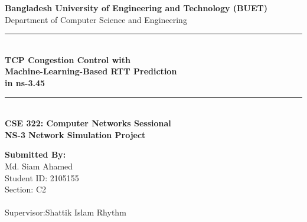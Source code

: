 \documentclass[12pt,a4paper]{article}
\begin{document}
\begin{titlepage}
\centering

\vspace*{1.5cm}

{\LARGE\bfseries Bangladesh University of Engineering and Technology (BUET)\\[0.4cm]}
{\large Department of Computer Science and Engineering\\[1cm]}

\vfill

\rule{\linewidth}{0.5mm}\\[0.5cm]
{\huge\bfseries TCP Congestion Control with\\[0.3cm]
Machine-Learning-Based RTT Prediction\\[0.3cm]
in ns-3.45\\[0.4cm]}
\rule{\linewidth}{0.5mm}\\[1.2cm]

{\Large\textbf{CSE 322: Computer Networks Sessional}}\\[0.4cm]
{\Large\textbf{NS-3 Network Simulation Project}}\\[0.3cm]

\vfill

\begin{minipage}{0.48\textwidth}
\begin{flushleft}
\large
\textbf{Submitted By:}\\[0.3cm]
Md. Siam Ahamed\\
Student ID: 2105155\\
Section: C2\\
\\
Supervisor:Shattik Islam Rhythm
\end{flushleft}
\end{minipage}

\vspace*{1.5cm}

\end{titlepage}
\end{document}
